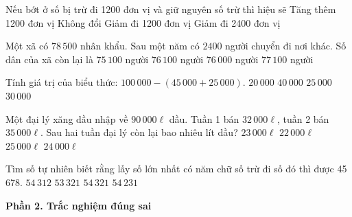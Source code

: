 \begin{ex} %
Nếu bớt ở số bị trừ đi 1200 đơn vị và giữ nguyên số trừ thì hiệu sẽ
\choice
{Tăng thêm 1200 đơn vị}
{Không đổi}
{\True Giảm đi 1200 đơn vị}
{Giảm đi 2400 đơn vị}
\end{ex}

\begin{ex} %
Một xã có $78\,500$ nhân khẩu. Sau một năm có $2400$ người chuyển đi nơi khác. Số dân của xã còn lại là
\choice
{$75\,100$ người}
{\True $76\,100$ người}
{$76\,000$ người}
{$77\,100$ người}
\end{ex}

\begin{ex} %
Tính giá trị của biểu thức: $100\,000 - (45\,000 + 25\,000)$.
\choice
{$20\,000$}
{$40\,000$}
{$25\,000$}
{\True $30\,000$}
\end{ex}

\begin{ex} %
Một đại lý xăng dầu nhập về $90\,000\ell$ dầu. Tuần 1 bán $32\,000\ell$, tuần 2 bán $35\,000\ell$. Sau hai tuần đại lý còn lại bao nhiêu lít dầu?
\choice
{\True $23\,000\ell$}
{$22\,000\ell$}
{$25\,000\ell$}
{$24\,000\ell$}
\end{ex}

\begin{ex} %
Tìm số tự nhiên biết rằng lấy số lớn nhất có năm chữ số trừ đi số đó thì được 45 678.
\choice
{$54\,312$}
{$53\,321$}
{\True $54\,321$}
{$54\,231$}
\end{ex}

\textbf{Phần 2. Trắc nghiệm đúng sai}

